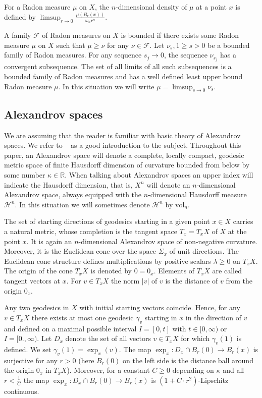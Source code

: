 \documentclass[12pt,leqno]{amsart}
\numberwithin{equation}{section}
\theoremstyle{definition}
\theoremstyle{remark}
\newcommand{\vol}{\mathrm{vol}}
\newcommand{\R}{\mathbb{R}}
\def\:{\colon}
\begin{document}
For a Radon measure $\mu$ on $X$, the $n$-dimensional density of $\mu$ at a point $x$ is defined by  $\limsup _{r\to 0} \frac {\mu (B_r(x))} {\omega _n r^n}$.

 A family   $\mathcal F$ of Radon measures on $X$ is bounded if there exists some Radon measure $\mu$ on $X$ such that $\mu \geq \nu $ for any $\nu \in \mathcal F$.  Let $\nu _s, 1\geq s >0$ be a bounded family of Radon measures. For any sequence $s_j\to 0$, the sequence $\nu _{s_j}$ has a convergent
subsequence. The set of all limits of all such subsequences is a bounded family of Radon measures and has a well defined least upper bound Radon measure $\mu$. In  this situation we will write $\mu =\limsup _{s\to 0} \nu _s$.   



\subsection{Alexandrov spaces} \label{subsec:Alex}
We are assuming that the reader is familiar with basic theory of Alexandrov spaces. We refer to ~\cite{BGP} as a good introduction to the subject. 
Throughout this paper, an Alexandrov space will denote a complete, locally compact, geodesic metric space of finite Hausdorff dimension of curvature bounded from below by some 
number $\kappa \in \R$. 
When talking about Alexandrov spaces an upper index will indicate the Hausdorff dimension, that is, $X^n$ will denote an $n$-dimensional Alexandrov space, always equipped with the $n$-dimensional Hausdorff measure $\mathcal H^n$. In this situation we will sometimes denote
 $\mathcal H^n$ by $\vol_n$.

The set of starting directions of geodesics starting in a given point $x\in X$ carries a natural metric, whose completion is the tangent space $T_x=T_xX$
of $X$ at the point $x$.  It is again an $n$-dimensional Alexandrov space of non-negative curvature. Moreover, it is the Euclidean cone
over the space $\Sigma _x$ of unit directions. The Euclidean cone structure defines multiplications by positive scalars $\lambda \geq 0$ on $T_xX$. The origin
of the cone $T_xX$ is denoted by $0=0_x$. Elements of $T_xX$ are called tangent vectors at $x$. For $v\in T_xX$ the norm $|v|$ of $v$ is the distance of $v$ from the origin $0_x$. 




Any two geodesics in $X$ with initial starting vectors coincide. Hence,
for any $v\in T_xX$ there exists at most one geodesic $\gamma _v$  starting in $x$ in the direction of $v$ and defined on a maximal possible interval $I =[0,t]$ with $t\in [0, \infty )$ 
or $I=[0.,\infty)$.  Let $D_x$ denote the set of all vectors $v\in T_xX$ for which $\gamma _v(1)$ is defined.
We set $\gamma _v (1)=\exp_x (v)$. The map $\exp_x \:D_x \cap B_r(0) \to B_r(x)$ is surjective for any $r>0$ (here $B_r(0)$ on the left side is the distance ball around the origin $0_x$ in $T_xX$). Moreover, for a constant $C\geq 0$ depending on $\kappa$ and all $r< \frac 1 C$ the map $\exp_x \:D_x \cap B_r(0) \to B_r(x)$ is  $(1+ C \cdot  r^2)$-Lipschitz continuous.
\end{document}
